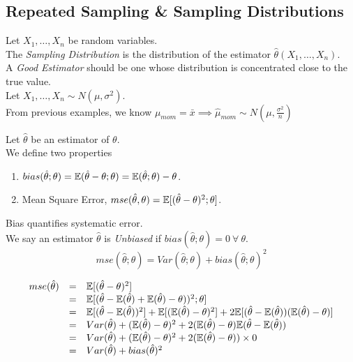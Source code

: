 \documentclass[11pt,a4paper]{article}
\begin{document}
\subsection{Repeated Sampling \& Sampling Distributions}

Let $X_1,\dots,X_n$ be random variables.\\
The \textit{Sampling Distribution} is the distribution of the estimator $\hat{\theta}(X_1,\dots,X_n)$.\\

A \textit{Good Estimator} should be one whose distribution is concentrated close to the true value.\\

Let $X_1,\dots,X_n\sim N(\mu,\sigma^2)$.\\
From previous examples, we know $\mu_{mom}=\bar{x}\implies\hat{\mu}_{mom}\sim N\left(\mu,\frac{\sigma^2}{n}\right)$

Let $\hat{\theta}$ be an estimator of $\theta$.\\
We define two properties
\begin{enumerate}[label=\roman*)]
	\item $bias(\hat{\theta};\theta)=\mathbb{E}(\hat{\theta}-\theta;\theta)=\mathbb{E}(\hat{\theta};\theta)-\theta$.
	\item Mean Square Error, $mse(\hat{\theta},\theta)=\mathbb{E}[(\hat{\theta}-\theta)^2;\theta]$.
\end{enumerate}
\nb Bias quantifies systematic error.\\

We say an estimator $\hat{\theta}$ is \textit{Unbiased} if $bias(\hat{\theta};\theta)=0\ \forall\ \theta$.\\

$$mse(\hat{\theta};\theta)=Var(\hat{\theta};\theta)+bias(\hat{\theta};\theta)^2$$

\[\begin{array}{rcl}
mse(\hat{\theta})&=&\mathbb{E}[(\hat{\theta}-\theta)^2]\\
&=&\mathbb{E}[(\hat{\theta}-\mathbb{E}(\hat{\theta})+\mathbb{E}(\hat{\theta})-\theta))^2;\theta]\\
&=&\mathbb{E}[(\hat{\theta}-\mathbb{E}(\hat{\theta}))^2]+\mathbb{E}[(\mathbb{E}(\hat{\theta})-\theta)^2]+2\mathbb{E}[(\hat{\theta}-\mathbb{E}(\hat{\theta}))(\mathbb{E}(\hat{\theta})-\theta)]\\
&=&Var(\hat{\theta})+(\mathbb{E}(\hat{\theta})-\theta)^2+2(\mathbb{E}(\hat{\theta})-\theta)\mathbb{E}(\hat{\theta}-\mathbb{E}(\hat{\theta}))\\
&=&Var(\hat{\theta})+(\mathbb{E}(\hat{\theta})-\theta)^2+2(\mathbb{E}(\hat{\theta})-\theta))\times0\\
&=&Var(\hat{\theta})+bias(\hat{\theta})^2
\end{array}\]
\end{document}
